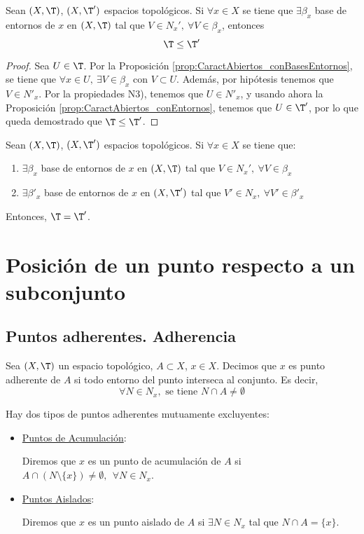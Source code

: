 \begin{prop}
    Sean $(X,\T)$, $(X,\T')$ espacios topológicos. Si $\forall x\in X$ se tiene que $\exists \beta_x$ base de entornos de $x$ en $(X,\T)$ tal que $V\in N_x',~\forall V\in \beta_x$, entonces $$\T\leq \T'$$
\end{prop}
\begin{proof}
    Sea $U\in \T$. Por la Proposición \ref{prop:CaractAbiertos_conBasesEntornos}, se tiene que $\forall x\in U,~\exists V\in \beta_x$ con $V\subset U$. Además, por hipótesis tenemos que $V\in N'_x$. Por la propiedades N3), tenemos que $U\in N'_x$, y usando ahora la Proposición \ref{prop:CaractAbiertos_conEntornos}, tenemos que $U\in \T'$, por lo que queda demostrado que $\T\leq \T'$.
\end{proof}
\begin{coro}\label{coro:TopIg_BasesEntornos}
    Sean $(X,\T)$, $(X,\T')$ espacios topológicos. Si $\forall x\in X$ se tiene que:
    \begin{enumerate}
        \item $\exists \beta_x$ base de entornos de $x$ en $(X,\T)$ tal que $V\in N_x',~\forall V\in \beta_x$
        \item $\exists \beta'_x$ base de entornos de $x$ en $(X,\T')$ tal que $V'\in N_x,~\forall V'\in \beta'_x$
    \end{enumerate}
    Entonces, $\T = \T'$.
\end{coro}


\section{Posición de un punto respecto a un subconjunto}
\subsection{Puntos adherentes. Adherencia}
\begin{definicion}
    Sea $(X,\T)$ un espacio topológico, $A\subset X$, $x\in X$. Decimos que $x$ es punto adherente de $A$ si todo entorno del punto interseca al conjunto. Es decir,
    \begin{equation*}
        \forall N\in N_x,\text{ se tiene } N\cap A\neq \emptyset
    \end{equation*}

    Hay dos tipos de puntos adherentes mutuamente excluyentes:
    \begin{itemize}
        \item \ul{Puntos de Acumulación}:

        Diremos que $x$ es un punto de acumulación de $A$ si $A\cap (N\setminus \{x\})\neq \emptyset, ~~\forall N\in N_x$.

        \item \ul{Puntos Aislados}:

        Diremos que $x$ es un punto aislado de $A$ si $\exists N\in N_x$ tal que $N\cap A=\{x\}$.
    \end{itemize}
\end{definicion}



